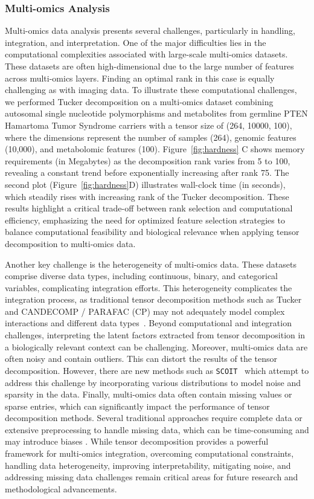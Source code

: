 \subsubsection{Multi-omics Analysis}
Multi-omics data analysis presents several challenges, particularly in handling, integration, and interpretation. One of the major difficulties lies in the computational complexities associated with large-scale multi-omics datasets. These datasets are often high-dimensional due to the large number of features across multi-omics layers. Finding an optimal rank in this case is equally challenging as with imaging data. 
To illustrate these computational challenges, we performed Tucker decomposition on a multi-omics dataset combining autosomal single nucleotide polymorphisms and metabolites from germline PTEN Hamartoma Tumor Syndrome carriers with a tensor size of (264, 10000, 100), where the dimensions represent the number of samples (264), genomic features (10,000), and metabolomic features (100). Figure~\ref{fig:hardness} C shows memory requirements (in Megabytes) as the decomposition rank varies from 5 to 100, revealing a constant trend before exponentially increasing after rank 75. The second plot (Figure~\ref{fig:hardness}D) illustrates wall-clock time (in seconds), which steadily rises with increasing rank of the Tucker decomposition. These results highlight a critical trade-off between rank selection and computational efficiency, emphasizing the need for optimized feature selection strategies to balance computational feasibility and biological relevance when applying tensor decomposition to multi-omics data. 

Another key challenge is the heterogeneity of multi-omics data. These datasets comprise diverse data types, including continuous, binary, and categorical variables, complicating integration efforts. This heterogeneity complicates the integration process, as traditional tensor decomposition methods such as Tucker and CANDECOMP / PARAFAC (CP) may not adequately model complex interactions and different data types~\cite{xu2015bayesian}. Beyond computational and integration challenges, interpreting the latent factors extracted from tensor decomposition in a biologically relevant context can be challenging. Moreover, multi-omics data are often noisy and contain outliers. This can distort the results of the tensor decomposition. However, there are new methods such as \texttt{SCOIT}~\cite{10.1093/nar/gkad570} which attempt to address this challenge by incorporating various distributions to model noise and sparsity in the data. Finally, multi-omics data often contain missing values or sparse entries, which can significantly impact the performance of tensor decomposition methods. Several traditional approaches require complete data or extensive preprocessing to handle missing data, which can be time-consuming and may introduce biases \cite{xu2015bayesian, taguchi2021tensor}. While tensor decomposition provides a powerful framework for multi-omics integration,  overcoming computational constraints, handling data heterogeneity, improving interpretability, mitigating noise, and addressing missing data challenges remain critical areas for future research and methodological advancements.

